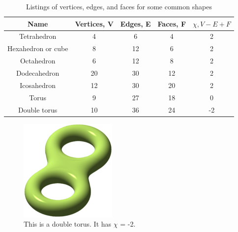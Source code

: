 \documentclass[12pt]{article}
\begin{document}
\begin{table}
\begin{tabular}{ccccc}
\label{EuChar}
Name  &	Vertices, V &	Edges, E & Faces, F &	$\chi, V - E + F$\\
\hline 
Tetrahedron &	4 &	6 &	4 &	2\\
Hexahedron or cube &	8 &	12 &	6 &	2\\
Octahedron 	&	6 &	12 &	8 & 2\\
Dodecahedron 	&	20 &	30 &	12 &	2\\
Icosahedron &	12 & 30 & 20 &	2\\
Torus & 9 & 27 & 18 & 0\\
Double torus & 10 & 36 & 24 & -2
\end{tabular}
\caption{Listings of vertices, edges, and faces for some common shapes \cite{wiki}}
\end{table}

\begin{figure}
\includegraphics{180px-Double_torus_illustration.png}
\caption{This is a double torus. It has $\chi$ = -2.}
\end{figure}

%  
\end{document}
